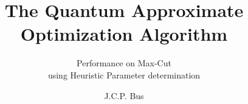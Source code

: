 \documentclass[whitelogo]{tudelft-report}
\theoremstyle{definition}
\begin{document}
\frontmatter


\title[tudelft-white]{The Quantum Approximate Optimization Algorithm} %
\subtitle[tudelft-black]{Performance on Max-Cut \\using Heuristic Parameter determination} %
\author[tudelft-white]{J.C.P. Bus}
\makecover[split]






\tableofcontents

\mainmatter










\appendix %

\end{document}
